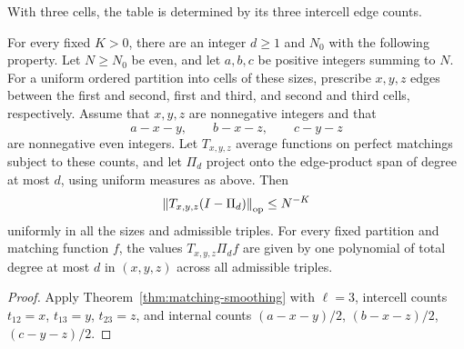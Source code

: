 With three cells, the table is determined by its three intercell edge counts.

\begin{corollary}\label{cor:three-cell}
For every fixed $K>0$, there are an integer $d\ge1$ and $N_0$ with the following property. Let $N\ge N_0$ be even, and let $a,b,c$ be positive integers summing to $N$. For a uniform ordered partition into cells of these sizes, prescribe $x,y,z$ edges between the first and second, first and third, and second and third cells, respectively. Assume that $x,y,z$ are nonnegative integers and that
\[
 a-x-y,\qquad b-x-z,\qquad c-y-z
\]
are nonnegative even integers. Let $T_{x,y,z}$ average functions on perfect matchings subject to these counts, and let $\Pi_d$ project onto the edge-product span of degree at most $d$, using uniform measures as above. Then
\[
 \left\lVert T_{x,y,z}(I-\Pi_d)\right\rVert_{\mathrm{op}}\le N^{-K}
\]
uniformly in all the sizes and admissible triples. For every fixed partition and matching function $f$, the values $T_{x,y,z}\Pi_df$ are given by one polynomial of total degree at most $d$ in $(x,y,z)$ across all admissible triples.
\end{corollary}

\begin{proof}
Apply Theorem~\ref{thm:matching-smoothing} with $\ell=3$, intercell counts $t_{12}=x$, $t_{13}=y$, $t_{23}=z$, and internal counts $(a-x-y)/2$, $(b-x-z)/2$, $(c-y-z)/2$.
\end{proof}
